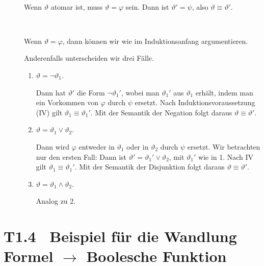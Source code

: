 \documentclass[fontsize=11pt, twoside=false, numbers=autoenddot]{scrbook}
\begin{document}
\par\medskip\noindent
\begin{beweis}
  \begin{description}
    \item[]
      ~\par
      Wenn $\vartheta$ atomar ist, muss $\vartheta = \varphi$ sein.
      Dann ist $\vartheta' = \psi$, also $\vartheta \equiv \vartheta'$.
    \item[]
      ~\par
      Wenn $\vartheta = \varphi$, dann können wir wie im Induktionsanfang argumentieren.
      \par
      Anderenfalls unterscheiden wir drei Fälle.
      \begin{enumerate}
        \item
          $\vartheta = \lnot \vartheta_1$.
          \par
          Dann hat $\vartheta'$ die Form $\lnot \vartheta_1'$,
          wobei man $\vartheta_1'$ aus $\vartheta_1$ erhält,
          indem man ein Vorkommen von $\varphi$ durch $\psi$ ersetzt.
          Nach Induktionsvoraussetzung (IV) gilt $\vartheta_1 \equiv \vartheta_1'$.
          Mit der Semantik der Negation folgt daraus $\vartheta \equiv \vartheta'$.
        \item
          $\vartheta = \vartheta_1 \lor \vartheta_2$.
          \par
          Dann wird $\varphi$ entweder in $\vartheta_1$ oder in $\vartheta_2$ durch $\psi$ ersetzt.
          Wir betrachten nur den ersten Fall: Dann ist $\vartheta' = \vartheta_1' \lor \vartheta_2$,
          mit $\vartheta_1'$ wie in 1.
          Nach IV gilt $\vartheta_1 \equiv \vartheta_1'$.
          Mit der Semantik der Disjunktion folgt daraus $\vartheta \equiv \vartheta'$.
        \item
          $\vartheta = \vartheta_1 \land \vartheta_2$.
          \par
          Analog zu 2.\qedhere
      \end{enumerate}
  \end{description}
\end{beweis}%

\pagebreak
\section*{T1.4~ Beispiel für die Wandlung Formel $\to$ Boolesche Funktion}
\end{document}
